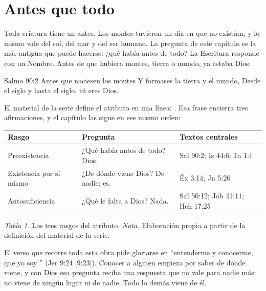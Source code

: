 
\section{Antes que todo}

Toda criatura tiene un antes. Los montes tuvieron un día en que no existían, y lo mismo vale del sol, del mar y del ser humano. La pregunta de este capítulo es la más antigua que puede hacerse: ¿qué había antes de todo? La Escritura responde con un Nombre. Antes de que hubiera montes, tierra o mundo, ya estaba Dios:

\begin{verso}{Salmo 90:2}
Antes que naciesen los montes Y formases la tierra y el mundo, Desde el siglo y hasta el siglo, tú eres Dios.
\end{verso}

El material de la serie define el atributo en una línea: . Esa frase encierra tres afirmaciones, y el capítulo las sigue en ese mismo orden:

\begin{center}\small\renewcommand{\arraystretch}{1.25}
\begin{tabular}{@{}L{3.2cm}L{6.4cm}L{4.8cm}@{}}
\toprule
\textbf{Rasgo} & \textbf{Pregunta} & \textbf{Textos centrales} \\ \midrule
Preexistencia & ¿Qué había antes de todo? Dios. & Sal 90:2; Is 44:6; Jn 1:1 \\
Existencia por sí mismo & ¿De dónde viene Dios? De nadie: es. & Éx 3:14; Jn 5:26 \\
Autosuficiencia & ¿Qué le falta a Dios? Nada. & Sal 50:12; Job 41:11; Hch 17:25 \\
\bottomrule
\end{tabular}\par
{\footnotesize\color{gris}\textit{Tabla 1.} Los tres rasgos del atributo. \textit{Nota.} Elaboración propia a partir de la definición del material de la serie.}
\end{center}

El verso que recorre toda esta obra pide gloriarse en ``entenderme y conocerme, que yo soy \SENOR'' (Jer 9:24 [9:23]). Conocer a alguien empieza por saber de dónde viene, y con Dios esa pregunta recibe una respuesta que no vale para nadie más: no viene de ningún lugar ni de nadie. Todo lo demás viene de él.

